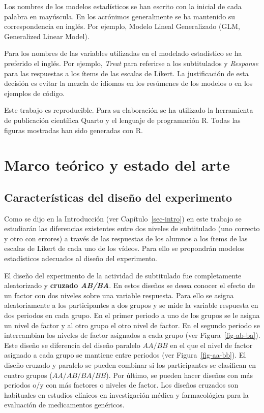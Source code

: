 \documentclass[
  12pt,
  a4paper,
  extrafontsizes,
  onecolumn,
  openright,
  table]{memoir}
\begin{document}
Los nombres de los modelos estadísticos se han escrito con la inicial de
cada palabra en mayúscula. En los acrónimos generalmente se ha mantenido
su correspondencia en inglés. Por ejemplo, Modelo Lineal Generalizado
(GLM, Generalized Linear Model).

Para los nombres de las variables utilizadas en el modelado estadístico
se ha preferido el inglés. Por ejemplo, \emph{Treat} para referirse a
los subtitulados y \emph{Response} para las respuestas a los ítems de
las escalas de Likert. La justificación de esta decisión es evitar la
mezcla de idiomas en los resúmenes de los modelos o en los ejemplos de
código.

Este trabajo es reproducible. Para su elaboración se ha utilizado la
herramienta de publicación científica Quarto y el lenguaje de
programación \gls{R}. Todas las figuras mostradas han sido generadas con
R.


\hypertarget{sec-arte}{%
\chapter{Marco teórico y estado del arte}\label{sec-arte}}

\hypertarget{caracteruxedsticas-del-diseuxf1o-del-experimento}{%
\section{Características del diseño del
experimento}\label{caracteruxedsticas-del-diseuxf1o-del-experimento}}

Como se dijo en la Introducción (ver Capítulo~\ref{sec-intro}) en este
trabajo se estudiarán las diferencias existentes entre dos niveles de
subtitulado (uno correcto y otro con errores) a través de las respuestas
de los alumnos a los ítems de las escalas de Likert de cada uno de los
vídeos. Para ello se propondrán modelos estadísticos adecuados al diseño
del experimento.

El diseño del experimento de la actividad de subtitulado fue
completamente aleatorizado y \textbf{cruzado \emph{AB/BA}}. En estos
diseños se desea conocer el efecto de un factor con dos niveles sobre
una variable respuesta. Para ello se asigna aleatoriamente a los
participantes a dos grupos y se mide la variable respuesta en dos
periodos en cada grupo. En el primer periodo a uno de los grupos se le
asigna un nivel de factor y al otro grupo el otro nivel de factor. En el
segundo periodo se intercambian los niveles de factor asignados a cada
grupo (ver Figura~\ref{fig-ab-ba}). Este diseño se diferencia del diseño
paralelo \(AA/BB\) en el que el nivel de factor asignado a cada grupo se
mantiene entre periodos (ver Figura~\ref{fig-aa-bb}). El
\gls{diseño cruzado} y paralelo se pueden combinar si los participantes
se clasifican en cuatro grupos (\(AA/AB/BA/BB\)). Por último, se pueden
hacer diseños con más periodos o/y con más factores o niveles de factor.
Los diseños cruzados son habituales en estudios clínicos en
investigación médica \autocite[ver][]{lim2021} y farmacológica para la
evaluación de medicamentos genéricos.
\end{document}
